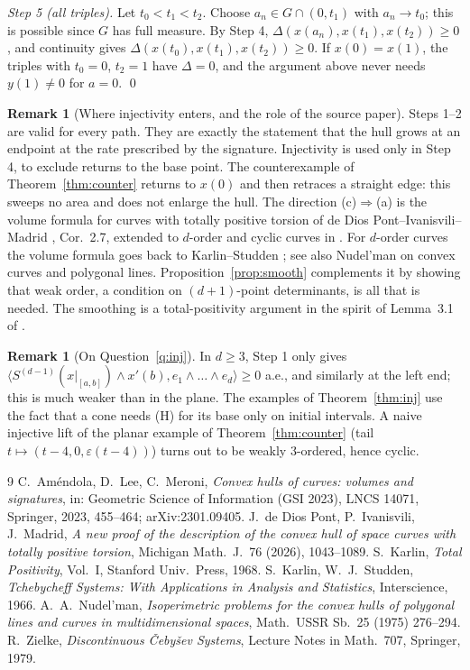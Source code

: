 \documentclass[11pt]{amsart}
\theoremstyle{definition}
\newtheorem{remark}[theorem]{Remark}
\begin{document}
\emph{Step 5 (all triples).} Let $t_0<t_1<t_2$. Choose $a_n\in G\cap(0,t_1)$ with $a_n\to t_0$; this is possible since $G$ has full measure.
By Step 4, $\Delta(x(a_n),x(t_1),x(t_2))\ge0$, and continuity gives $\Delta(x(t_0),x(t_1),x(t_2))\ge0$.
If $x(0)=x(1)$, the triples with $t_0=0$, $t_2=1$ have $\Delta=0$, and the argument above never needs $y(1)\ne0$ for $a=0$. \qed

\begin{remark}[Where injectivity enters, and the role of the source paper]
Steps 1--2 are valid for every path. They are exactly the statement that the hull grows at an endpoint at the rate prescribed by the
signature. Injectivity is used only in Step 4, to exclude returns to the base point. The counterexample of Theorem~\ref{thm:counter}
returns to $x(0)$ and then retraces a straight edge: this sweeps no area and does not enlarge the hull.
The direction (c)$\Rightarrow$(a) is the volume formula for curves with totally positive torsion of de Dios Pont--Ivanisvili--Madrid
\cite{DIM}, Cor.~2.7, extended to $d$-order and cyclic curves in \cite{ALM}. For $d$-order curves the volume formula goes back to Karlin--Studden \cite{KS}; see also
Nudel'man \cite{N} on convex curves and polygonal lines. Proposition~\ref{prop:smooth} complements it by showing that
weak order, a condition on $(d+1)$-point determinants, is all that is needed. The smoothing is a total-positivity argument in the
spirit of Lemma~3.1 of \cite{DIM}.
\end{remark}

\begin{remark}[On Question~\ref{q:inj}]
In $d\ge3$, Step 1 only gives $\langle S^{(d-1)}(x|_{[a,b]})\wedge x'(b),e_1\wedge\dots\wedge e_d\rangle\ge0$ a.e., and similarly at the left end; this is much weaker than in
the plane. The examples of Theorem~\ref{thm:inj} use the fact that a cone needs (H) for its base only on initial intervals. A naive injective lift of the planar example
of Theorem~\ref{thm:counter} (tail $t\mapsto(t-4,0,\varepsilon(t-4))$) turns out to be weakly $3$-ordered, hence cyclic.
\end{remark}

\begin{thebibliography}{9}
 C.~Am\'endola, D.~Lee, C.~Meroni, \emph{Convex hulls of curves: volumes and signatures}, in: Geometric Science of
Information (GSI 2023), LNCS 14071, Springer, 2023, 455--464; arXiv:2301.09405.
 J.~de Dios Pont, P.~Ivanisvili, J.~Madrid, \emph{A new proof of the description of the convex hull of space curves with
totally positive torsion}, Michigan Math.\ J.\ 76 (2026), 1043--1089.
 S.~Karlin, \emph{Total Positivity}, Vol.~I, Stanford Univ.\ Press, 1968.
 S.~Karlin, W.~J.~Studden, \emph{Tchebycheff Systems: With Applications in Analysis and Statistics}, Interscience, 1966.
 A.~A.~Nudel'man, \emph{Isoperimetric problems for the convex hulls of polygonal lines and curves in multidimensional spaces}, Math.\ USSR Sb.\ 25 (1975) 276--294.
 R.~Zielke, \emph{Discontinuous \v Ceby\v sev Systems}, Lecture Notes in Math.\ 707, Springer, 1979.
\end{thebibliography}
\end{document}
